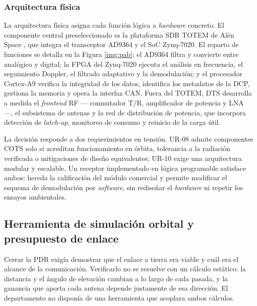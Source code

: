 \subsubsection{Arquitectura física}

La arquitectura física asigna cada función lógica a \textit{hardware} concreto. El componente central preseleccionado es la plataforma SDR TOTEM de Alén Space \parencite{alenspace}, que integra el transceptor AD9364 y el SoC Zynq-7020. El reparto de funciones se detalla en la Figura \ref{img:pab}: el AD9364 filtra y convierte entre analógico y digital; la FPGA del Zynq-7020 ejecuta el análisis en frecuencia, el seguimiento Doppler, el filtrado adaptativo y la demodulación; y el procesador Cortex-A9 verifica la integridad de los datos, identifica los metadatos de la DCP, gestiona la memoria y opera la interfaz CAN. Fuera del TOTEM, DTS desarrolla a medida el \textit{frontend} RF --- conmutador T/R, amplificador de potencia y LNA ---, el subsistema de antenas y la red de distribución de potencia, que incorpora detección de \textit{latch-up}, monitoreo de consumo y reinicio de la carga útil.

La decisión responde a dos requerimientos en tensión. UR-08 admite componentes COTS solo si acreditan funcionamiento en órbita, tolerancia a la radiación verificada o mitigaciones de diseño equivalentes; UR-10 exige una arquitectura modular y escalable. Un receptor implementado en lógica programable satisface ambos: hereda la calificación del módulo comercial y permite modificar el esquema de demodulación por \textit{software}, sin rediseñar el \textit{hardware} ni repetir los ensayos ambientales.



\subsection{Herramienta de simulación orbital y presupuesto de enlace}

Cerrar la PDR exigía demostrar que el enlace a tierra era viable y cuál era el alcance de la comunicación. Verificarlo no se resuelve con un cálculo estático: la distancia y el ángulo de elevación cambian a lo largo de cada pasada, y la ganancia que aporta cada antena depende justamente de esa dirección. El departamento no disponía de una herramienta que acoplara ambos cálculos.

